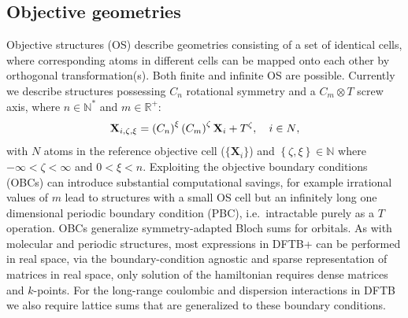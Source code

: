 \documentclass{revtex4-1}
\newcommand{\dftbp}{DFTB+}
\begin{document}
\subsection{Objective geometries}

Objective structures\cite{James2006} (OS) describe geometries consisting of a
set of identical cells, where corresponding atoms in different cells can be
mapped onto each other by orthogonal transformation(s). Both finite and infinite
OS are possible. Currently we describe
structures\cite{James2006,Dumitrica2007,ZhangHuaDumitrica2008}
possessing $C_n$ rotational symmetry and a $C_m \otimes T$ screw axis, where $n
\in \mathbb{N}^{*}$ and $m \in \mathbb{R}^{+}$:
\begin{equation}
  \mathbf{X}_{i, \zeta, \xi} =
  \left(C_n\right)^\xi \left(C_m\right)^\zeta \mathbf{X}_{i}+ T^\zeta,\quad{i \in N},
  \label{basic_replicate_obj}
\end{equation}
with $N$ atoms in the reference objective cell ($\{\mathbf{X}_i\}$) and
$\left\{\zeta,\xi\right\} \in \mathbb{N}$ where $-\infty < \zeta < \infty$ and
$0 < \xi < n$. Exploiting the objective boundary conditions (OBCs) can introduce
substantial computational savings, for example irrational values of $m$ lead to
structures with a small OS cell but an infinitely long one dimensional periodic
boundary condition (PBC), i.e.\ intractable purely as a $T$ operation. OBCs
generalize symmetry-adapted Bloch sums for orbitals. As with molecular and
periodic structures,\cite{aradi-jpca-2007} most expressions in \dftbp{} can be
performed in real space, via the boundary-condition agnostic and sparse
representation of matrices in real space, only solution of the hamiltonian
requires dense matrices and $k$-points. For the long-range coulombic and
dispersion interactions in DFTB we also require lattice sums that are
generalized to these boundary conditions.\cite{Nikiforov2013}
\end{document}
